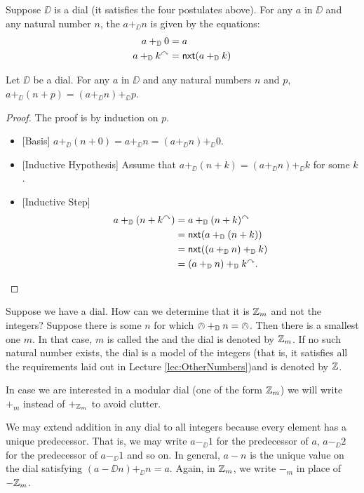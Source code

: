 \begin{defn}
	Suppose $\DD$ is a dial (it satisfies the four postulates above). For any $a$ in $\DD$ and any natural number $n$, the  $a+_\DD n$ is given by the equations:
	\begin{align*}
		a +_{\mathbb D} 0 &= a\\
		a +_{\mathbb D} k^\curvearrowright &= \mathord{\textsf{nxt}}(a+_{\mathbb D} k)
	\end{align*}
\end{defn}

\begin{lem}
	Let $\DD$ be a dial.
	For any $a$ in $\DD$ and any natural numbers $n$ and $p$, $a +_\DD (n+p) = (a +_\DD n) +_\DD p$.
	
	\begin{proof}
		The proof is by induction on $p$. 
		\begin{itemize}
			\item{}[Basis] $a +_\DD (n+0) = a +_\DD n = (a +_\DD n) +_\DD 0$.
			\item{}[Inductive Hypothesis] Assume that $a +_\DD (n+k) = (a +_\DD n) +_\DD k$ for some $k$.
			\item{}[Inductive Step] 
			\begin{align*}
				a +_{\mathbb D} (n+k^\curvearrowright) &= a +_{\mathbb D} (n+k)^\curvearrowright\\ 
				                 &= \mathord{\textsf{nxt}}(a +_{\mathbb D} (n+k))\\
				                 &= \mathord{\textsf{nxt}}((a +_{\mathbb D} n) +_{\mathbb D} k)\\
				                 &= (a +_{\mathbb D} n) +_{\mathbb D} k^\curvearrowright.
			\end{align*}
		\end{itemize}
	\end{proof}
\end{lem}

Suppose we have a dial. How can we determine that it is ${\mathbb Z}_m$ and not the integers? Suppose there is some $n$ for which $\owedge +_{\mathbb D} n = \owedge$. Then there is a smallest one $m$. In that case, $m$ is called the  and the dial is denoted by ${\mathbb Z}_m$. If no such natural number exists, the dial is a model of the integers (that is, it satisfies all the requirements laid out in Lecture \ref{lec:OtherNumbers})and is denoted by ${\mathbb Z}$.

In case we are interested in a modular dial (one of the form ${\mathbb Z}_m$) we will write $+_m$ instead of $+_{{\mathbb Z}_m}$ to avoid clutter.

We may extend addition in any dial to all integers because every element has a unique predecessor. That is, we may write $a-_\DD 1$ for the predecessor of $a$, $a-_\DD 2$ for the predecessor of $a-_\DD 1$ and so on. In general, $a-n$ is the unique value on the dial satisfying $(a-\DD n) +_\DD n = a$. Again, in ${\mathbb Z}_m$, we write $-_m$ in place of $-{{\mathbb Z}_m}$. 

